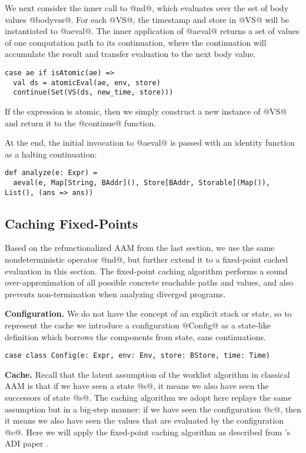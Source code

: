 \documentclass[acmsmall,review,anonymous]{acmart}\settopmatter{printfolios=true,printccs=false,printacmref=false}
\begin{document}
We next consider the inner call to @nd@, which evaluates over the set of body values @bodyvss@.
For each @VS@, the timestamp and store in @VS@ will be instantiated to
@aeval@.
The inner application of @aeval@ returns a set of values of one computation path to its
continuation, where the continuation will accumulate the result and transfer
evaluation to the next body value.

\begin{lstlisting}
case ae if isAtomic(ae) =>
  val ds = atomicEval(ae, env, store)
  continue(Set(VS(ds, new_time, store)))
\end{lstlisting}

If the expression is atomic, then we simply construct a new instance of
@VS@ and return it to the @continue@ function.

At the end, the initial invocation to @aeval@ is passed with an identity
function as a halting continuation:
\begin{lstlisting}
def analyze(e: Expr) =
  aeval(e, Map[String, BAddr](), Store[BAddr, Storable](Map()), List(), (ans => ans))
\end{lstlisting}

\subsection{Caching Fixed-Points}

Based on the refunctionalized AAM from the last section, we use the same nondeterministic
operator @nd@, but further extend it to a fixed-point cached evaluation in this section.
The fixed-point caching algorithm performs a sound over-approximation of all possible
concrete reachable paths and values, and also prevents non-termination when analyzing diverged programs.

\textbf{Configuration.}
We do not have the concept of an explicit stack or state,
so to represent the cache we introduce a configuration @Config@ as
a state-like definition which borrows the components from state, sans continuations.
\begin{lstlisting}
case class Config(e: Expr, env: Env, store: BStore, time: Time)
\end{lstlisting}

\textbf{Cache.}
Recall that the latent assumption of the worklist algorithm in classical AAM
is that if we have seen a state @s@, it means we also have seen the successors
of state @s@.
The caching algorithm we adopt here replays the same assumption but in a big-step
manner: if we have seen the configuration @c@, then it means we also have seen
the values that are evaluated by the configuration @c@.
Here we will apply the fixed-point caching algorithm as described from
\citeauthor{darais2017abstracting}'s ADI paper \cite{darais2017abstracting}.
\end{document}
